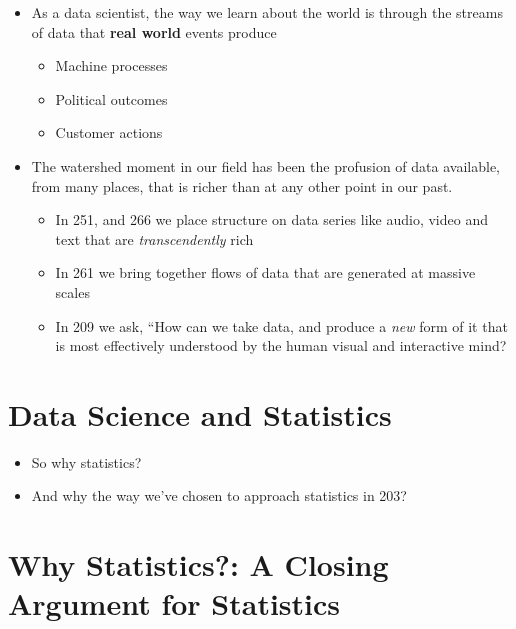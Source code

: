 \documentclass[
]{book}
\providecommand{\tightlist}{%
  \setlength{\itemsep}{0pt}\setlength{\parskip}{0pt}}
\theoremstyle{definition}
\theoremstyle{definition}
\theoremstyle{definition}
\theoremstyle{definition}
\theoremstyle{remark}
\begin{document}
\begin{itemize}
\tightlist
\item
  As a data scientist, the way we learn about the world is through the streams of data that \textbf{real world} events produce

  \begin{itemize}
  \tightlist
  \item
    Machine processes
  \item
    Political outcomes
  \item
    Customer actions
  \end{itemize}
\item
  The watershed moment in our field has been the profusion of data available, from many places, that is richer than at any other point in our past.

  \begin{itemize}
  \tightlist
  \item
    In 251, and 266 we place structure on data series like audio, video and text that are \emph{transcendently} rich
  \item
    In 261 we bring together flows of data that are generated at massive scales
  \item
    In 209 we ask, ``How can we take data, and produce a \emph{new} form of it that is most effectively understood by the human visual and interactive mind?
  \end{itemize}
\end{itemize}

\hypertarget{data-science-and-statistics}{%
\section{Data Science and Statistics}\label{data-science-and-statistics}}

\begin{itemize}
\tightlist
\item
  So why statistics?
\item
  And why the way we've chosen to approach statistics in 203?
\end{itemize}

\hypertarget{why-statistics-a-closing-argument-for-statistics}{%
\section{Why Statistics?: A Closing Argument for Statistics}\label{why-statistics-a-closing-argument-for-statistics}}
\end{document}
